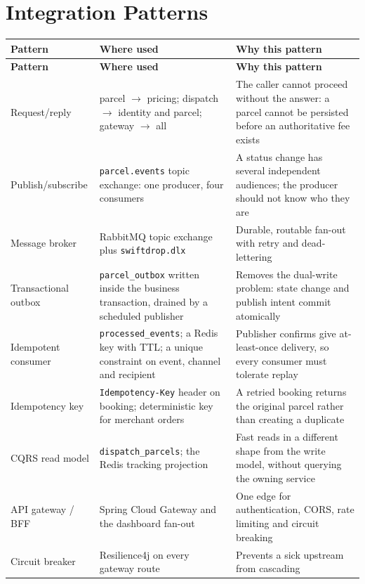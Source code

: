 \documentclass[11pt,a4paper,oneside,openany]{report}
\newcommand{\code}[1]{\texttt{\small #1}}
\begin{document}
\section{Integration Patterns}
\begin{center}
\small
\begin{longtable}{@{}p{3.3cm}p{5.0cm}p{6.0cm}@{}}
\toprule
\textbf{Pattern} & \textbf{Where used} & \textbf{Why this pattern} \\
\midrule
\endfirsthead
\toprule
\textbf{Pattern} & \textbf{Where used} & \textbf{Why this pattern} \\
\midrule
\endhead
Request/reply & parcel $\rightarrow$ pricing; dispatch $\rightarrow$ identity and parcel;
gateway $\rightarrow$ all & The caller cannot proceed without the answer: a parcel cannot be
persisted before an authoritative fee exists \\
\addlinespace
Publish/subscribe & \code{parcel.events} topic exchange: one producer, four consumers & A status
change has several independent audiences; the producer should not know who they are \\
\addlinespace
Message broker & RabbitMQ topic exchange plus \code{swiftdrop.dlx} & Durable, routable fan-out
with retry and dead-lettering \\
\addlinespace
Transactional outbox & \code{parcel\_outbox} written inside the business transaction, drained by
a scheduled publisher & Removes the dual-write problem: state change and publish intent commit
atomically \\
\addlinespace
Idempotent consumer & \code{processed\_events}; a Redis key with TTL; a unique constraint on
event, channel and recipient & Publisher confirms give at-least-once delivery, so every consumer
must tolerate replay \\
\addlinespace
Idempotency key & \code{Idempotency-Key} header on booking; deterministic key for merchant orders
& A retried booking returns the original parcel rather than creating a duplicate \\
\addlinespace
CQRS read model & \code{dispatch\_parcels}; the Redis tracking projection & Fast reads in a
different shape from the write model, without querying the owning service \\
\addlinespace
API gateway / BFF & Spring Cloud Gateway and the dashboard fan-out & One edge for authentication,
CORS, rate limiting and circuit breaking \\
\addlinespace
Circuit breaker & Resilience4j on every gateway route & Prevents a sick upstream from cascading \\

\end{longtable}
\end{center}
\end{document}
